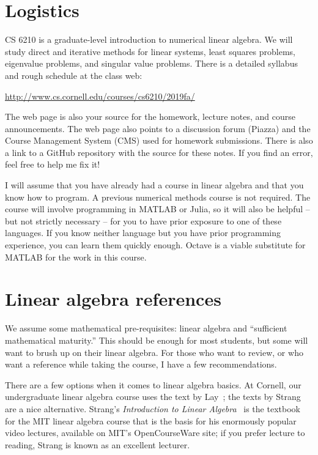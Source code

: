 \documentclass[12pt, leqno]{article} %
\begin{document}


\section{Logistics}

CS 6210 is a graduate-level introduction to numerical linear algebra. We
will study direct and iterative methods for linear systems, least
squares problems, eigenvalue problems, and singular value problems.
There is a detailed syllabus and rough schedule at the class web:
\begin{center}
  \url{http://www.cs.cornell.edu/courses/cs6210/2019fa/}
\end{center}
The web page is also your source for the homework, lecture notes,
and course announcements.  The web page also points to a discussion
forum (Piazza) and the Course Management System (CMS) used for homework
submissions.  There is also a link to a GitHub repository with
the source for these notes.  If you find an error, feel free to
help me fix it!

I will assume that you have already had a course in linear algebra and
that you know how to program.  A previous numerical methods course is
not required.  The course will involve programming in MATLAB or Julia,
so it will also be helpful -- but not strictly necessary -- for you to
have prior exposure to one of these languages.  If you know neither
language but you have prior programming experience, you can learn them
quickly enough.  Octave is a viable substitute for MATLAB for the work
in this course.

\section{Linear algebra references}

We assume some mathematical pre-requisites: linear algebra
and ``sufficient mathematical maturity.''  This should be enough for
most students, but some will want to brush up on their linear algebra.
For those who want to review, or who want a reference while taking
the course, I have a few recommendations.

There are a few options when it comes to linear algebra basics.  At
Cornell, our undergraduate linear algebra course uses the text
by Lay~\cite{Lay:2016:Linear}; the texts by Strang~\cite{Strang:2006:Linear,Strang:2009:Introduction} are a nice
alternative.  Strang's {\em Introduction to Linear Algebra}~\cite{Strang:2009:Introduction} is the textbook for the MIT
linear algebra course that is the basis for his enormously popular
video lectures, available on MIT's OpenCourseWare site; if you prefer
lecture to reading, Strang is known as an excellent lecturer.
\end{document}
